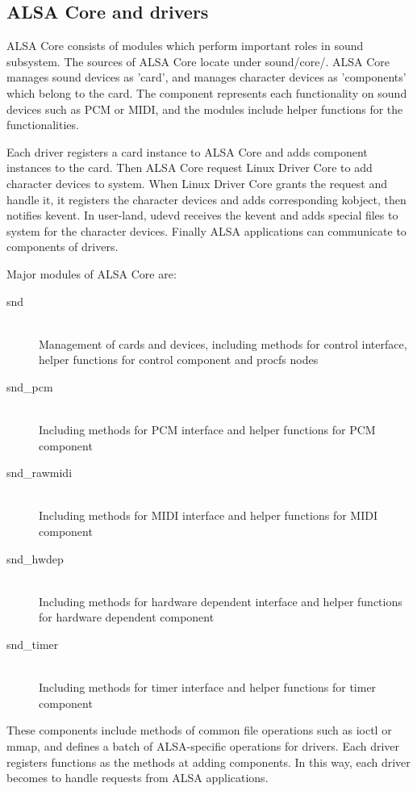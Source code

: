 \documentclass[onecolumn]{article}
\begin{document}
\subsection{ALSA Core and drivers}

ALSA Core consists of modules which perform important roles in sound subsystem. The sources of ALSA Core locate under sound/core/. ALSA Core manages sound devices as 'card', and manages character devices as 'components' which belong to the card. The component represents each functionality on sound devices such as PCM or MIDI, and the modules include helper functions for the functionalities.

Each driver registers a card instance to ALSA Core and adds component instances to the card. Then ALSA Core request Linux Driver Core to add character devices to system. When Linux Driver Core grants the request and handle it, it registers the character devices and adds corresponding kobject, then notifies kevent. In user-land, udevd receives the kevent and adds special files to system for the character devices. Finally ALSA applications can communicate to components of drivers.

Major modules of ALSA Core are:

\begin{description}
\item[snd] \mbox{} \\
Management of cards and devices, including methods for control interface, helper functions for control component and procfs nodes
\item[snd\_pcm] \mbox{} \\
Including methods for PCM interface and helper functions for PCM component
\item[snd\_rawmidi] \mbox{} \\
Including methods for MIDI interface and helper functions for MIDI component
\item[snd\_hwdep] \mbox{} \\
Including methods for hardware dependent interface and helper functions for hardware dependent component
\item[snd\_timer] \mbox{} \\
Including methods for timer interface and helper functions for timer component
\end{description}

These components include methods of common file operations such as ioctl or mmap, and defines a batch of ALSA-specific operations for drivers. Each driver registers functions as the methods at adding components. In this way, each driver becomes to handle requests from ALSA applications\cite{alsa-driver}.
\end{document}
